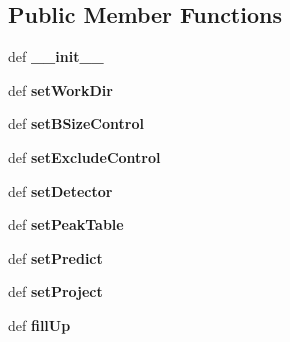 \subsection*{Public Member Functions}
\begin{DoxyCompactItemize}
\item 
\hypertarget{classsimulateDlg_1_1simulateDlg_a30e20ab290a85ace9b9f1aa244d7c474}{def {\bfseries \-\_\-\-\_\-init\-\_\-\-\_\-}}\label{classsimulateDlg_1_1simulateDlg_a30e20ab290a85ace9b9f1aa244d7c474}

\item 
\hypertarget{classsimulateDlg_1_1simulateDlg_ae8ad62465bea76aeb7ced4d34d8ca56a}{def {\bfseries set\-Work\-Dir}}\label{classsimulateDlg_1_1simulateDlg_ae8ad62465bea76aeb7ced4d34d8ca56a}

\item 
\hypertarget{classsimulateDlg_1_1simulateDlg_a53b3c5047a7a281b5baeec7135492591}{def {\bfseries set\-B\-Size\-Control}}\label{classsimulateDlg_1_1simulateDlg_a53b3c5047a7a281b5baeec7135492591}

\item 
\hypertarget{classsimulateDlg_1_1simulateDlg_a97123c1f3e8b1b340dc382a6fd86a101}{def {\bfseries set\-Exclude\-Control}}\label{classsimulateDlg_1_1simulateDlg_a97123c1f3e8b1b340dc382a6fd86a101}

\item 
\hypertarget{classsimulateDlg_1_1simulateDlg_abe6b4f3fef4b78d2c7a2555727653de1}{def {\bfseries set\-Detector}}\label{classsimulateDlg_1_1simulateDlg_abe6b4f3fef4b78d2c7a2555727653de1}

\item 
\hypertarget{classsimulateDlg_1_1simulateDlg_a3087ff8625ca2596757a04e8d57c6aef}{def {\bfseries set\-Peak\-Table}}\label{classsimulateDlg_1_1simulateDlg_a3087ff8625ca2596757a04e8d57c6aef}

\item 
\hypertarget{classsimulateDlg_1_1simulateDlg_ac656f0af5fb6ead3d58c3a79cbe90453}{def {\bfseries set\-Predict}}\label{classsimulateDlg_1_1simulateDlg_ac656f0af5fb6ead3d58c3a79cbe90453}

\item 
\hypertarget{classsimulateDlg_1_1simulateDlg_afc7435e2812554e7059d3d9e908183ff}{def {\bfseries set\-Project}}\label{classsimulateDlg_1_1simulateDlg_afc7435e2812554e7059d3d9e908183ff}

\item 
\hypertarget{classsimulateDlg_1_1simulateDlg_a251194e1c458621e24fdfdeb409342c6}{def {\bfseries fill\-Up}}\label{classsimulateDlg_1_1simulateDlg_a251194e1c458621e24fdfdeb409342c6}


\end{DoxyCompactItemize}
